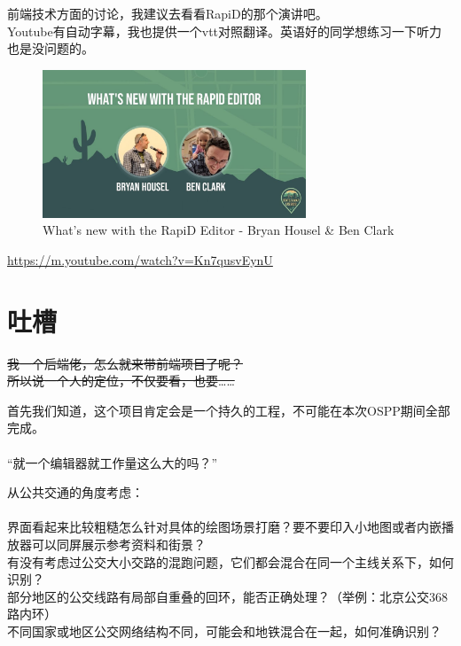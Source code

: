\documentclass{beamer}
\begin{document}
\begin{frame}
    前端技术方面的讨论，我建议去看看RapiD的那个演讲吧。\\
    Youtube有自动字幕，我也提供一个vtt对照翻译。英语好的同学想练习一下听力也是没问题的。 \\
    

    \begin{figure}[H]
        \centering
        \includegraphics[width=0.7\textwidth]{figure/youtube-Kn7qusvEynU.jpg}
        \caption{What's new with the RapiD Editor - Bryan Housel \& Ben Clark}
    \end{figure}

    \url{https://m.youtube.com/watch?v=Kn7qusvEynU}
\end{frame}

\section{吐槽}

\begin{frame}
    \Large
    \sout{我一个后端佬，怎么就来带前端项目了呢？}\\
    \sout{所以说一个人的定位，不仅要看，也要……}
\end{frame}

\begin{frame}
    \large
    首先我们知道，这个项目肯定会是一个持久的工程，不可能在本次OSPP期间全部完成。\\
    \\
    “就一个编辑器就工作量这么大的吗？”
\end{frame}


\begin{frame}
    \large
    从公共交通的角度考虑：\\
    \\
    界面看起来比较粗糙怎么针对具体的绘图场景打磨？要不要印入小地图或者内嵌播放器可以同屏展示参考资料和街景？\\
    有没有考虑过公交大小交路的混跑问题，它们都会混合在同一个主线关系下，如何识别？\\
    部分地区的公交线路有局部自重叠的回环，能否正确处理？（举例：北京公交368路内环）\\
    不同国家或地区公交网络结构不同，可能会和地铁混合在一起，如何准确识别？
\end{frame}
\end{document}
